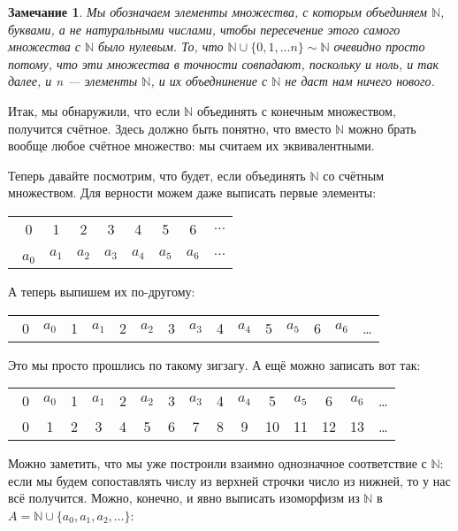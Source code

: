 \documentclass[12pt, onecolumn]{report}
\newtheorem*{remark}{Замечание}
\begin{document}
\begin{remark}
Мы обозначаем элементы множества, с которым объединяем $\mathbb N$, буквами, а не натуральными числами, чтобы пересечение этого самого множества с $\mathbb N$ было нулевым. То, что $\mathbb N \cup \{0, 1, \ldots n\} \sim \mathbb N$ очевидно просто потому, что эти множества в точности совпадают, поскольку и ноль, и так далее, и n --- элементы $\mathbb N$, и их объеднинение с $\mathbb N$ не даст нам ничего нового.
\end{remark}

Итак, мы обнаружили, что если $\mathbb N$ объединять с конечным множеством, получится счётное. Здесь должно быть понятно, что вместо $\mathbb N$ можно брать вообще любое счётное множество: мы считаем их эквивалентными.

Теперь давайте посмотрим, что будет, если объединять $\mathbb N$ со счётным множеством. Для верности можем даже выписать первые элементы:

\begin{flushleft}
\begin{tabular}{cccccccc}
\ 0 & 1 & 2 & 3 & 4 & 5 & 6 & $\ldots$ \\
\ $a_0$ & $a_1$ & $a_2$ & $a_3$ & $a_4$ & $a_5$ & $a_6$ & $\ldots$ \\
\end{tabular}
\end{flushleft}

А теперь выпишем их по-другому:
\begin{flushleft}
\begin{tabular}{ccccccccccccccc}
\ 0 & $a_0$ & 1 & $a_1$ & 2 & $a_2$ & 3 & $a_3$ & 4 & $a_4$ & 5 & $a_5$ & 6 & $a_6$ & \ldots \\
\end{tabular}
\end{flushleft}

Это мы просто прошлись по такому зигзагу.
А ещё можно записать вот так:

\begin{flushleft}
\begin{tabular}{ccccccccccccccc}
\ 0 & $a_0$ & 1 & $a_1$ & 2 & $a_2$ & 3 & $a_3$ & 4 & $a_4$ & 5 & $a_5$ & 6 & $a_6$ & \ldots \\
\ 0 & 1 & 2 & 3 & 4 & 5 & 6 & 7 & 8 & 9 & 10 & 11 & 12 & 13 & \ldots \\
\end{tabular}
\end{flushleft}

Можно заметить, что мы уже построили взаимно однозначное соответствие с $\mathbb N$: если мы будем сопоставлять числу из верхней строчки число из нижней, то у нас всё получится. Можно, конечно, и явно выписать изоморфизм из $\mathbb N$ в $A =\mathbb N \cup \{a_0, a_1, a_2, \ldots \}$:
\end{document}

